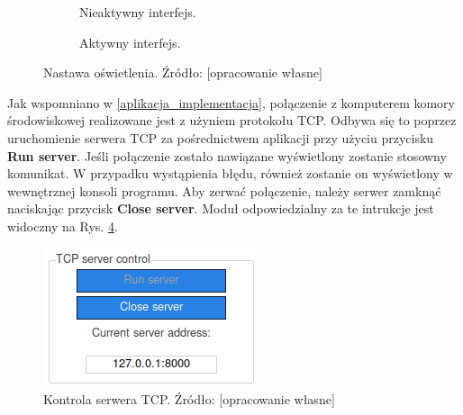 \begin{figure}[h]
	\centering
	
	\begin{subfigure}[h]{.49\textwidth}
		\centering
		\setlength{\fboxsep}{0pt}
		\setlength{\fboxrule}{1pt}
		\caption{Nieaktywny interfejs.}
		\label{fig:oswietlacz_gui_nieaktywne}
	\end{subfigure}
	\hfill%
	\begin{subfigure}[h]{.49\textwidth}
		\centering
		\setlength{\fboxsep}{0pt}
		\setlength{\fboxrule}{1pt}
		\caption{Aktywny interfejs.} 
		\label{fig:oswietlacz_gui_aktywne}
	\end{subfigure}
	
	\caption{Nastawa oświetlenia. Źródło: [opracowanie własne]}
	\label{fig:oswietlacz_gui}
		
\end{figure}
Jak wspomniano w \ref{aplikacja_implementacja}, połączenie z komputerem komory środowiskowej realizowane jest z użyniem protokołu TCP. Odbywa się to poprzez uruchomienie serwera TCP za pośrednictwem aplikacji przy użyciu przycisku \textbf{Run server}. Jeśli połączenie zostało nawiązane wyświetlony zostanie stosowny komunikat. W przypadku wystąpienia błędu, również zostanie on wyświetlony w wewnętrznej konsoli programu. Aby zerwać połączenie, należy serwer zamknąć naciskając przycisk \textbf{Close server}. Moduł odpowiedzialny za te intrukcje jest widoczny na Rys. \ref{fig:tcp_gui}.\\

\begin{figure}[h]
	
	\centering
	\includegraphics[scale=2]{serwer}
	\caption{Kontrola serwera TCP. Źródło: [opracowanie własne]} 
	\label{fig:tcp_gui}
	
\end{figure}

